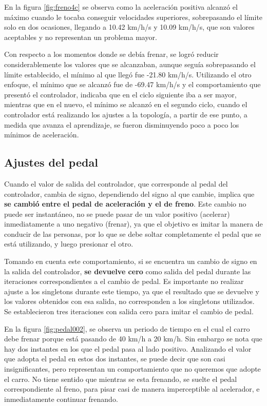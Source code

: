 En la figura \ref{fig:freno4c} se observa como la aceleración positiva alcanzó el máximo cuando le tocaba conseguir velocidades superiores, sobrepasando el límite solo en dos ocasiones, llegando a 10.42 km/h/s y 10.09 km/h/s, que son valores aceptables y no representan un problema mayor. 

Con respecto a los momentos donde se debía frenar, se logró reducir considerablemente los valores que se alcanzaban, aunque seguía sobrepasando el límite establecido, el mínimo al que llegó fue -21.80 km/h/s. Utilizando el otro enfoque, el mínimo que se alcanzó fue de -69.47 km/h/s y el comportamiento que presentó el controlador, indicaba que en el ciclo siguiente iba a ser mayor, mientras que en el nuevo, el mínimo se alcanzó en el segundo ciclo, cuando el controlador está realizando los ajustes a la topología, a partir de ese punto, a medida que avanza el aprendizaje, se fueron disminuyendo poco a poco los mínimos de aceleración.


\subsection{Ajustes del pedal}
\label{sec:ajusteP}


Cuando el valor de salida del controlador, que corresponde al pedal del controlador, cambia de signo, dependiendo del signo al que cambie, implica que \textbf{se cambió entre el pedal de aceleración y el de freno}. Este cambio no puede ser instantáneo, no se puede pasar de un valor positivo (acelerar) inmediatamente a uno negativo (frenar), ya que el objetivo es imitar la manera de conducir de las personas, por lo que se debe soltar completamente el pedal que se está utilizando, y luego presionar el otro. 

Tomando en cuenta este comportamiento, si se encuentra un cambio de signo en la salida del controlador, \textbf{se devuelve cero} como salida del pedal durante las iteraciones correspondientes a el cambio de pedal. Es importante no realizar ajuste a los singletons durante este tiempo, ya que el resultado que se devuelve y los valores obtenidos con esa salida, no corresponden a los singletons utilizados. Se establecieron tres iteraciones con salida cero para imitar el cambio de pedal.


En la figura \ref{fig:pedal002}, se observa un periodo de tiempo en el cual el carro debe frenar porque está pasando de 40 km/h a 20 km/h. Sin embargo se nota que hay dos instantes en los que el pedal pasa al lado positivo. Analizando el valor que adopta el pedal en estos dos instantes, se puede decir que son casi insignificantes, pero representan un comportamiento que no queremos que adopte el carro. No tiene sentido que mientras se esta frenando, se suelte el pedal correspondiente al freno, para pisar casi de manera imperceptible al acelerador, e inmediatamente continuar frenando. 

